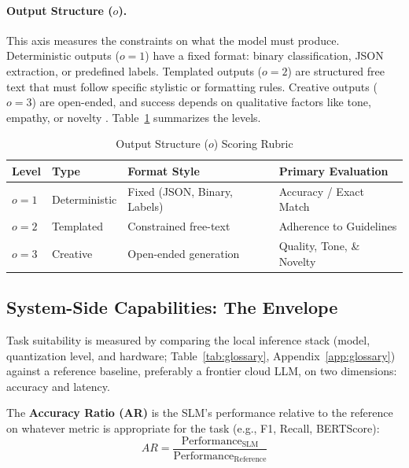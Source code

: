 \documentclass[11pt]{article}
\begin{document}
\paragraph{Output Structure ($o$).}
This axis measures the constraints on what the model must produce. Deterministic outputs ($o=1$) have a fixed format: binary classification, JSON extraction, or predefined labels. Templated outputs ($o=2$) are structured free text that must follow specific stylistic or formatting rules. Creative outputs ($o=3$) are open-ended, and success depends on qualitative factors like tone, empathy, or novelty \cite{Bubeck2023}. Table~\ref{tab:output} summarizes the levels.

\begin{table}[ht]
  \centering
  \caption{Output Structure ($o$) Scoring Rubric}
  \label{tab:output}
  \begin{tabular}{@{}llll@{}}
    \toprule
    Level & Type & Format Style & Primary Evaluation \\
    \midrule
    $o=1$ & Deterministic & Fixed (JSON, Binary, Labels) & Accuracy / Exact Match \\
    $o=2$ & Templated & Constrained free-text & Adherence to Guidelines \\
    $o=3$ & Creative & Open-ended generation & Quality, Tone, \& Novelty \\
    \bottomrule
  \end{tabular}
\end{table}

\subsection{System-Side Capabilities: The Envelope}
\label{sec:system}

Task suitability is measured by comparing the local inference stack (model, quantization level, and hardware; Table~\ref{tab:glossary}, Appendix~\ref{app:glossary}) \cite{Dettmers2024} against a reference baseline, preferably a frontier cloud LLM, on two dimensions: accuracy and latency.

The \textbf{Accuracy Ratio (AR)} is the SLM's performance relative to the reference on whatever metric is appropriate for the task (e.g., F1, Recall, BERTScore):
\begin{equation}
  AR = \frac{\text{Performance}_{\text{SLM}}}{\text{Performance}_{\text{Reference}}}
  \label{eq:ar}
\end{equation}
\end{document}
